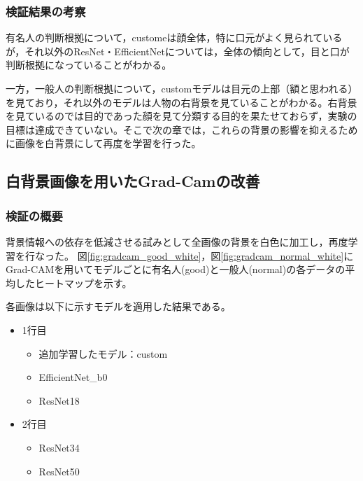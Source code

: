 \documentclass[a4paper,11pt,titlepage]{jsarticle}
\begin{document}
\subsubsection{検証結果の考察}
有名人の判断根拠について，customeは顔全体，特に口元がよく見られているが，それ以外のResNet・EfficientNetについては，全体の傾向として，目と口が判断根拠になっていることがわかる。\par
一方，一般人の判断根拠について，customモデルは目元の上部（額と思われる）を見ており，それ以外のモデルは人物の右背景を見ていることがわかる。右背景を見ているのでは目的であった顔を見て分類する目的を果たせておらず，実験の目標は達成できていない。そこで次の章では，これらの背景の影響を抑えるために画像を白背景にして再度を学習を行った。




\subsection{白背景画像を用いたGrad-Camの改善}
\subsubsection{検証の概要}

背景情報への依存を低減させる試みとして全画像の背景を白色に加工し，再度学習を行なった。
図\ref{fig:gradcam_good_white}，図\ref{fig:gradcam_normal_white}にGrad-CAMを用いてモデルごとに有名人(good)と一般人(normal)の各データの平均したヒートマップを示す。

各画像は以下に示すモデルを適用した結果である。
\begin{itemize}
	\item 1行目
	\begin{itemize}
	\item 追加学習したモデル：custom
	\item EfficientNet\_b0
	\item ResNet18
	\end{itemize}
	\item 2行目
	\begin{itemize}
	\item ResNet34
	\item ResNet50
	\end{itemize}
\end{itemize}
\end{document}
